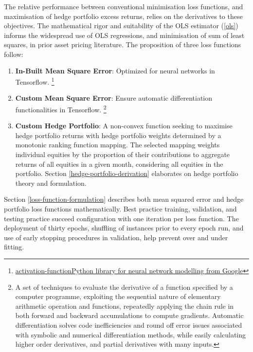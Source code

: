 \documentclass[12pt]{article}
\begin{document}
The relative performance between conventional minimisation loss functions, and maximisation of hedge portfolio excess returns, relies on the derivatives to these objectives.
The mathematical rigor and suitability of the OLS estimator (\ref{ols}) informs the widespread use of OLS regressions, and minimisation of sum of least squares, in prior asset pricing literature.
The proposition of three loss functions follow:
\singlespacing
\begin{enumerate}
	\item \textbf{In-Built Mean Square Error}: Optimized for neural networks in Tensorflow. \footnote{\href{https://www.tensorflow.org/}{activation-functionPython library for neural network modelling from Google}}
	\item \textbf{Custom Mean Square Error}: Ensure automatic differentiation functionalities in Tensorflow.
	      \footnote{A set of techniques to evaluate the derivative of a function specified by a computer programme,
		      exploiting the sequential nature of elementary arithmetic operation and functions, repeatedly applying the chain rule in both forward and backward accumulations to compute gradients.
		      Automatic differentiation solves code inefficiencies and round off error issues associated with symbolic and numerical differentiation methods, while easily calculating higher order derivatives, and partial derivatives with many inputs.}
	\item \textbf{Custom Hedge Portfolio}: A non-convex function seeking to maximise hedge portfolio returns with hedge portfolio weights determined by a monotonic ranking function mapping.
	      The selected mapping weights individual equities by the proportion of their contributions to aggregate returns of all equities in a given month, considering all equities in the portfolio.
	      Section \ref{hedge-portfolio-derivation} elaborates on hedge portfolio theory and formulation.
\end{enumerate}
Section \ref{loss-function-formulation} describes both mean squared error and hedge portfolio loss functions mathematically.
Best practice training, validation, and testing practice succeed configuration with one iteration per loss function.
The deployment of thirty epochs, shuffling of instances prior to every epoch run, and use of early stopping procedures in validation, help prevent over and under fitting.
\end{document}
